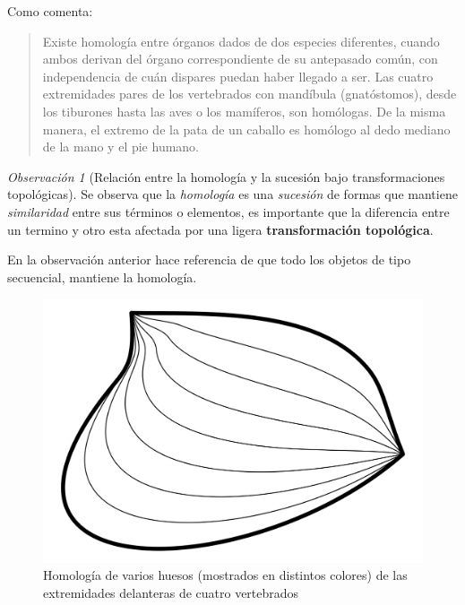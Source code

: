 \documentclass[
  11pt,
]{krantz}
\theoremstyle{definition}
\theoremstyle{definition}
\theoremstyle{definition}
\theoremstyle{definition}
\theoremstyle{remark}
\newtheorem*{remark}{Observación}
\begin{document}
Como \citet{homology} comenta:

\begin{quote}
Existe homología entre órganos dados de dos especies diferentes, cuando ambos derivan del órgano correspondiente de su antepasado común, con independencia de cuán dispares puedan haber llegado a ser. Las cuatro extremidades pares de los vertebrados con mandíbula (gnatóstomos), desde los tiburones hasta las aves o los mamíferos, son homólogas. De la misma manera, el extremo de la pata de un caballo es homólogo al dedo mediano de la mano y el pie humano.
\end{quote}

\begin{remark}[Relación entre la homología y la sucesión bajo transformaciones topológicas]

Se observa que la \emph{homología}  es una \emph{sucesión} de formas que mantiene \emph{similaridad} entre sus términos o elementos, es importante que la diferencia entre un termino y otro esta afectada por una ligera \textbf{transformación topológica}.

\end{remark}

En la observación anterior hace referencia de que todo los objetos de tipo secuencial, mantiene la homología.

\begin{figure}[!ht]

{\centering \includegraphics[width=1\linewidth]{homotopia} 

}

\caption{Homología de varios huesos (mostrados en distintos colores) de las extremidades delanteras de cuatro vertebrados}\label{fig:homologia}
\end{figure}
\end{document}
